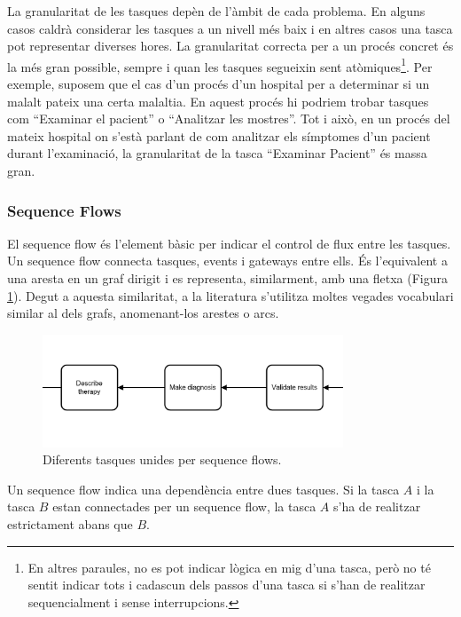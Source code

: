 La granularitat de les tasques depèn de l'àmbit de cada problema. En alguns casos caldrà considerar les tasques a un nivell més baix i en altres casos una tasca pot representar diverses hores. La granularitat correcta per a un procés concret és la més gran possible, sempre i quan les tasques segueixin sent atòmiques\footnote{En altres paraules, no es pot indicar lògica en mig d'una tasca, però no té sentit indicar tots i cadascun dels passos d'una tasca si s'han de realitzar sequencialment i sense interrupcions.}. Per exemple, suposem que el cas d'un procés d'un hospital per a determinar si un malalt pateix una certa malaltia. En aquest procés hi podriem trobar tasques com ``Examinar el pacient'' o ``Analitzar les mostres''. Tot i això, en un procés del mateix hospital on s'està parlant de com analitzar els símptomes d'un pacient durant l'examinació, la granularitat de la tasca ``Examinar Pacient'' és massa gran.

\subsubsection{Sequence Flows}

El sequence flow és l'element bàsic per indicar el control de flux entre les tasques. Un sequence flow connecta tasques, events i gateways entre ells. És l'equivalent a una aresta en un graf dirigit i es representa, similarment, amb una fletxa (Figura \ref{fig:sequenceflow-example}). Degut a aquesta similaritat, a la literatura s'utilitza moltes vegades vocabulari similar al dels grafs, anomenant-los arestes o arcs.

\begin{figure}[!hbt]
    \centering
    \includegraphics[width=0.8\textwidth]{figures/bpmn-sequenceflows.png}
    \caption{Diferents tasques unides per sequence flows.}
    \label{fig:sequenceflow-example}
\end{figure}


Un sequence flow indica una dependència entre dues tasques. Si la tasca $A$ i la tasca $B$ estan connectades per un sequence flow, la tasca $A$ s'ha de realitzar estrictament abans que $B$.

